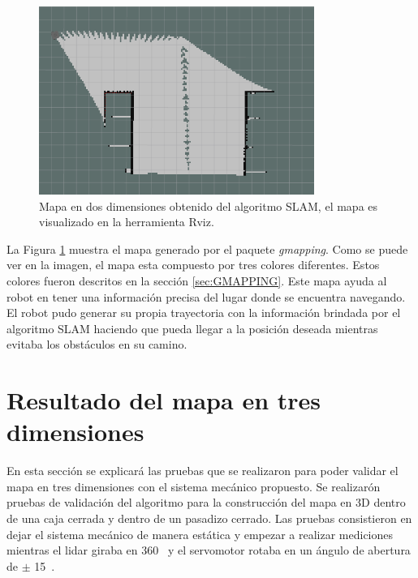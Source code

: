 \begin{figure}
  \centering \footnotesize
  \includegraphics[width=0.80\textwidth]{images/map_slam.png}
  \captionsetup{font=footnotesize}
  \caption{Mapa en dos dimensiones obtenido del algoritmo SLAM, el mapa es 
  visualizado en la herramienta Rviz.}
  \label{fig:SLAM_2D}
\end{figure}

La Figura \ref{fig:SLAM_2D} muestra el mapa generado por el paquete \textit{gmapping}. Como 
se puede ver en la imagen, el mapa esta compuesto por tres colores diferentes. Estos
colores fueron descritos en la sección \ref{sec:GMAPPING}. Este mapa ayuda al robot
en tener una información precisa del lugar donde se encuentra navegando. El robot pudo
generar su propia trayectoria con la información brindada por el algoritmo SLAM haciendo
que pueda llegar a la posición deseada mientras evitaba los obstáculos en su camino.


\section{Resultado del mapa en tres dimensiones}
En esta sección se explicará las pruebas que se realizaron para poder validar el mapa en 
tres dimensiones con el sistema mecánico propuesto. Se realizarón pruebas de validación 
del algoritmo para la construcción del mapa en 3D dentro de una caja cerrada y dentro de 
un pasadizo cerrado. Las pruebas consistieron en dejar el sistema mecánico de manera 
estática y empezar a realizar mediciones mientras el lidar giraba en 360\grad~ y el 
servomotor rotaba en un ángulo de abertura de $\pm$ 15\grad~.

